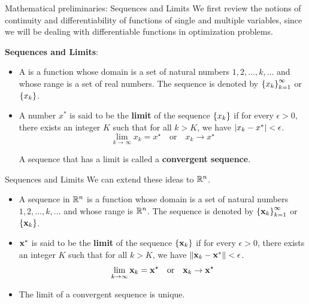 \documentclass[aspectratio=169]{beamer}
\let\olditem\item
\renewcommand{\item}{\setlength{\itemsep}{\fill}\olditem}
\def\mf{\ensuremath\mathbf}
\def\mb{\ensuremath\mathbb}
\def\lv{\ensuremath\left\lvert}
\def\rv{\ensuremath\right\rvert}
\def\lV{\ensuremath\left\lVert}
\def\rV{\ensuremath\right\rVert}
\def\lc{\ensuremath\left\{}
\def\rc{\ensuremath\right\}}
\def\R{\ensuremath\mb{R}}
\begin{document}
\begin{frame}[t]{Mathematical preliminaries: Sequences and Limits}
  We first review the notions of continuity and differentiability of functions of single and multiple variables, since we will be dealing with differentiable functions in optimization problems.
  \vspace{0.2cm}

  \textbf{Sequences and Limits}:
  \begin{itemize}
    \item A  is a function whose domain is a set of natural numbers $1, 2, \ldots, k, \ldots$ and whose range is a set of real numbers. The sequence is denoted by $\lc x_k\rc_{k=1}^{\infty}$ or $\lc x_k \rc$.
    \vspace{0.25cm}
  
    \item A number $x^{*}$ is said to be the \textbf{limit} of the sequence $\lc x_k \rc$ if for every $\epsilon > 0$, there exists an integer $K$ such that for all $k > K$, we have $\lv x_k - x^{*} \rv < \epsilon$.
    \[ \lim_{k \to \infty} x_k = x^{\star} \quad \mathrm{or} \quad x_k \to x^{\star} \]

    A sequence that has a limit is called a \textbf{convergent sequence}.
  \end{itemize}
\end{frame}


\begin{frame}[t]{Sequences and Limits}
  We can extend these ideas to $\R^n$.
  \begin{itemize}
    \item A sequence in $\R^n$ is a function whose domain is a set of natural numbers $1, 2, \ldots, k, \ldots$ and whose range is $\R^n$. The sequence is denoted by $\lc \mf{x}_k\rc_{k=1}^{\infty}$ or $\lc \mf{x}_k \rc$.
    \vspace{0.25cm}
  
    \item $\mf{x}^{*}$ is said to be the \textbf{limit} of the sequence $\lc \mf{x}_k \rc$ if for every $\epsilon > 0$, there exists an integer $K$ such that for all $k > K$, we have $\lV \mf{x}_k - \mf{x}^{*} \rV < \epsilon$.
    \[ \lim_{k \to \infty} \mf{x}_k = \mf{x}^{\star} \quad \mathrm{or} \quad \mf{x}_k \to \mf{x}^{\star} \]

    \item The limit of a convergent sequence is unique.
  \end{itemize}
\end{frame}
\end{document}
